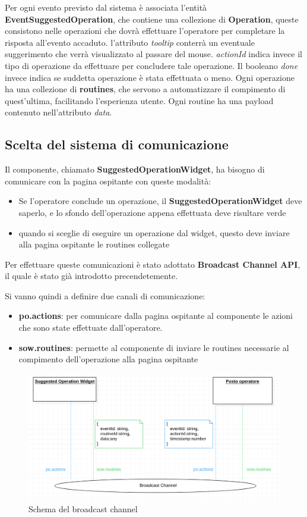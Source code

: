 Per ogni evento previsto dal sistema è associata l'entità \textbf{EventSuggestedOperation}, che contiene una collezione
di \textbf{Operation}, queste consistono nelle operazioni che dovrà effettuare l'operatore per completare la risposta 
all'evento accaduto. l'attributo \emph{tooltip} conterrà un eventuale suggerimento che verrà visualizzato al passare del 
mouse. \emph{actionId} indica invece il tipo di operazione da effettuare per concludere tale operazione. Il booleano \emph{done} invece indica se suddetta 
operazione è stata effettuata o meno. Ogni operazione ha una collezione di \textbf{routines}, che servono a automatizzare il compimento 
di quest'ultima, facilitando l'esperienza utente. Ogni routine ha una payload contenuto nell'attributo \emph{data}.


\subsection{Scelta del sistema di comunicazione}
Il componente, chiamato \textbf{SuggestedOperationWidget}, ha bisogno di comunicare con la pagina ospitante con queste modalità:
\begin{itemize}
    \item Se l'operatore conclude un operazione, il \textbf{SuggestedOperationWidget} deve saperlo, e lo sfondo dell'operazione 
    appena effettuata deve risultare verde
    \item quando si sceglie di eseguire un operazione dal widget, questo deve inviare alla pagina ospitante le routines collegate
\end{itemize}

Per effettuare queste comunicazioni è stato adottato \textbf{Broadcast Channel API}, il quale è stato già introdotto precendetemente.

Si vanno quindi a definire due canali di comunicazione:
\begin{itemize}
    \item \textbf{po.actions}: per comunicare dalla pagina ospitante al componente le azioni che sono state effettuate dall'operatore.
    \item \textbf{sow.routines}: permette al componente di inviare le routines necessarie al compimento dell'operazione alla pagina ospitante
\end{itemize}
\begin{figure}[H]
    \centering
    \includegraphics[width=150mm]{img/broadcast_channel}
    \caption{Schema del broadcast channel}
  \end{figure}



